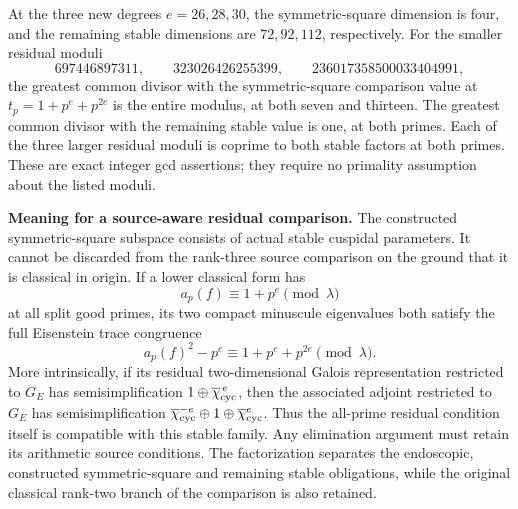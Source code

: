 \documentclass[11pt,a4paper]{article}
\theoremstyle{definition}
\renewcommand{\paragraph}[1]{\par\smallskip\noindent\textbf{#1}\quad\ignorespaces}
\begin{document}
At the three new degrees $e=26,28,30$, the symmetric-square
dimension is four, and the remaining stable dimensions are
$72,92,112$, respectively.  For the smaller residual moduli
\[
 697446897311,\qquad323026426255399,\qquad
 236017358500033404991,
\]
the greatest common divisor with the symmetric-square
comparison value at $t_p=1+p^e+p^{2e}$ is the entire modulus,
at both seven and thirteen.  The greatest common divisor with
the remaining stable value is one, at both primes.  Each of
the three larger residual moduli is coprime to both stable
factors at both primes.  These are exact integer gcd assertions;
they require no primality assumption about the listed moduli.

\paragraph{Meaning for a source-aware residual comparison.}
The constructed symmetric-square subspace consists of actual
stable cuspidal parameters.  It cannot be discarded from the
rank-three source comparison on the ground that it is classical
in origin.  If a lower classical form has
\[
               a_p(f)\equiv1+p^e\pmod\lambda
\]
at all split good primes, its two compact minuscule eigenvalues
both satisfy the full Eisenstein trace congruence
\[
       a_p(f)^2-p^e\equiv1+p^e+p^{2e}\pmod\lambda.
\]
More intrinsically, if its residual two-dimensional Galois
representation restricted to $G_E$ has semisimplification
$1\oplus\overline\chi_{\rm cyc}^{\,e}$, then the associated
adjoint restricted to $G_E$ has semisimplification
$\overline\chi_{\rm cyc}^{-e}\oplus1\oplus
 \overline\chi_{\rm cyc}^{e}$.
Thus the all-prime residual condition itself is compatible
with this stable family.  Any elimination argument must
retain its arithmetic source conditions.  The factorization
separates the endoscopic, constructed symmetric-square and
remaining stable obligations, while the original classical
rank-two branch of the comparison is also retained.
\end{document}
